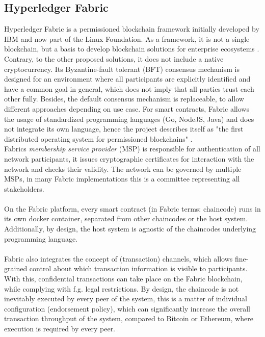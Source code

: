 \subsection{Hyperledger Fabric}
Hyperledger Fabric is a permissioned blockchain framework initially developed by IBM and now part of the Linux Foundation. As a framework, it is not a single blockchain, but a basis to develop blockchain solutions for enterprise ecosystems \cite{androulaki2018hyperledger}. Contrary, to the other proposed solutions, it does not include a native cryptocurrency. Its Byzantine-fault tolerant (BFT) consensus mechanism \cite{castro1999practical} is designed for an environment where all participants are explicitly identified and have a common goal in general, which does not imply that all parties trust each other fully. Besides, the default consensus mechanism is replaceable, to allow different approaches depending on use case. For smart contracts, Fabric allows the usage of standardized programming languages (Go, NodeJS, Java) and does not integrate its own language, hence the project describes itself as "the first distributed operating system for permissioned blockchains" \cite{androulaki2018hyperledger}.
\\
Fabrics \textit{membership service provider} (MSP) is responsible for authentication of all network participants, it issues cryptographic certificates for interaction with the network and checks their validity. The network can be governed by multiple MSPs, in many Fabric implementations this is a committee representing all stakeholders.
\\ \\
On the Fabric platform, every smart contract (in Fabric terms: chaincode) runs in its own docker container, separated from other chaincodes or the host system. Additionally, by design, the host system is agnostic of the chaincodes underlying programming language.
\\ \\
Fabric also integrates the concept of (transaction) channels, which allows fine-grained control about which transaction information is visible to participants. With this, confidential transactions can take place on the Fabric blockchain, while complying with f.g. legal restrictions.
By design, the chaincode is not inevitably executed by every peer of the system, this is a matter of individual configuration (endorsement policy), which can significantly increase the overall transaction throughput of the system, compared to Bitcoin or Ethereum, where execution is required by every peer.